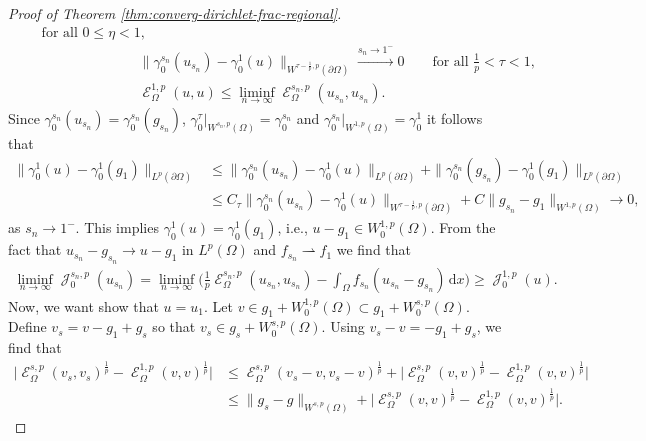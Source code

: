 \documentclass[12pt, reqno]{amsart}%
\theoremstyle{plain}  %
\theoremstyle{definition}  %
\theoremstyle{remark}
\numberwithin{equation}{section}
\DeclareMathOperator{\cE}{\mathcal{E}}
\DeclareMathOperator{\cJ}{\mathcal{J}}
\renewcommand{\d}{\,\mathrm{d}}
\begin{document}
\begin{proof}[Proof of Theorem \ref{thm:converg-dirichlet-frac-regional}]
\begin{align*}
\qquad\text{for all $0\leq \eta<1$}, \\
&\|\gamma^{s_n}_0(u_{s_n}) -\gamma^1_0(u)\|_{W^{\tau-\frac{1}{p},p}(\partial\Omega)}\xrightarrow{s_n\to 1^-}0\qquad\text{for all $\frac1{p} <\tau<1$},\\
&\cE^{1,p}_\Omega(u,u) \leq \liminf_{n\to\infty}\cE^{s_n,p}_\Omega(u_{s_n}, u_{s_n}).
\end{align*}
Since $\gamma^{s_n}_0 (u_{s_n})= \gamma^{s_n}_0(g_{s_n})$,  $ \gamma^{\tau}_0|_{W^{s_n,p}(\Omega)}=\gamma^{s_n}_0$ and $\gamma^{s_n}_0|_{W^{1,p}(\Omega)}= \gamma^{1}_0$  it follows that
\begin{align*}
\|\gamma^1_0(u)-\gamma^1_0(g_1)\|_{L^{p}(\partial\Omega)}
&\leq \|\gamma^{s_n}_0(u_{s_n}) -\gamma^1_0(u)\|_{L^{p}(\partial\Omega)}
+ \|\gamma^{s_n}_0(g_{s_n}) -\gamma^1_0( g_1)\|_{L^{p}(\partial\Omega)}\\
&\leq C_\tau \|\gamma^{s_n}_0(u_{s_n}) -\gamma^1_0(u)\|_{W^{\tau-\frac{1}{p},p}(\partial\Omega)}
+ C\|g_{s_n}- g_1\|_{W^{1,p}(\Omega)}
\to0,
\end{align*}
as $s_n\to 1^-$. This implies $\gamma^1_0(u)= \gamma^1_0(g_1)$, i.e., $u-g_1\in W^{1,p}_0(\Omega)$.
 From the fact that  $u_{s_n}-g_{s_n}\to u-g_{1}$ in $L^p(\Omega)$ and $f_{s_n}\rightharpoonup f_1 $ we find that
\begin{align*}
\liminf_{n\to\infty}\cJ_0^{s_n,p}(u_{s_n})= \liminf_{n\to\infty}\big(\tfrac{1}{p} \cE_\Omega^{s_n,p}(u_{s_n},u_{s_n} )-\int_\Omega f_{s_n}(u_{s_n}-g_{s_n})\d x \big) \geq  \cJ^{1,p}_0(u).
\end{align*}
Now, we want show that $u=u_1$.  Let $v\in g_1+W^{1,p}_0(\Omega)\subset g_1+W^{s,p}_0(\Omega)$. Define $v_s=v-g_1+g_s$ so that $v_s\in g_s+ W^{s,p}_0(\Omega)$. Using $v_s-v=-g_1+g_s$, we find that
\begin{align*}
\big|\cE^{s,p}_\Omega(v_s,v_s)^{\frac{1}{p}}-\cE^{1,p}_\Omega(v,v)^{\frac{1}{p}}\big|
&\leq \cE^{s,p}_\Omega(v_s-v,v_s-v)^{\frac{1}{p}}+ \big|\cE^{s,p}_\Omega(v,v)^{\frac{1}{p}}-\cE^{1,p}_\Omega(v,v)^{\frac{1}{p}}\big|\\
&\leq  \|g_s-g\|_{W^{s,p}(\Omega)}+ \big|\cE^{s,p}_\Omega(v,v)^{\frac{1}{p}}-\cE^{1,p}_\Omega(v,v)^{\frac{1}{p}}\big|.
\end{align*}

\end{proof}
\end{document}
